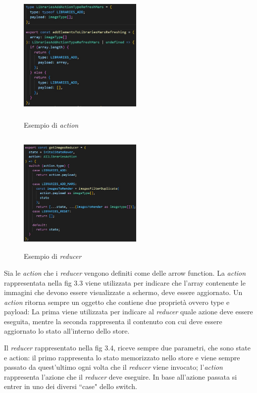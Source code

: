 \begin{figure}[h]
    \begin{minipage}[b]{0.47\textwidth}
        \centering
        \includegraphics[width=6cm, height=6cm]{images/ActionRedux.jpg}
        \caption{\label{f_etichetta1} Esempio di \textit{action}}
    \end{minipage}
    \hfill
    \begin{minipage}[b]{0.47\textwidth}
        \centering
        \includegraphics[width=6cm, height=6cm]{images/ReduxReducersFunction.jpg}
        \caption{\label{f_etichetta2}Esempio di \textit{reducer}}
    \end{minipage}
\end{figure}

Sia le \textit{action} che i \textit{reducer} vengono definiti come delle arrow function. La \textit{action} rappresentata nella fig 3.3 viene utilizzata per indicare che l'array contenente le immagini che devono essere visualizzate a schermo, deve essere aggiornato.
Un \textit{action} ritorna sempre un oggetto che contiene due propriet\`a ovvero type e payload: La prima viene utilizzata per indicare al \textit{reducer} quale azione deve essere eseguita, mentre la seconda rappresenta il contenuto con cui deve essere aggiornato lo stato all'interno dello store.

Il \textit{reducer} rappresentato nella fig 3.4, riceve sempre due parametri, che sono state e action: il primo rappresenta lo stato memorizzato nello store e viene sempre passato da quest'ultimo ogni volta che il \textit{reducer} viene invocato; l'\textit{action} rappresenta l'azione che il \textit{reducer} deve eseguire.
In base all'azione passata si entrer in uno dei diversi ``case" dello switch.

